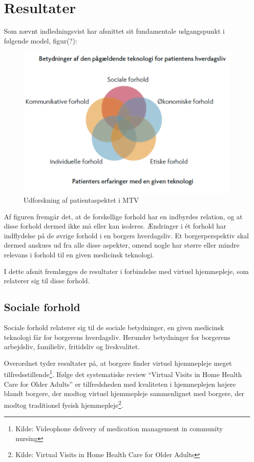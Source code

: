 \section{Resultater}
Som nævnt indledningsvist har afsnittet sit fundamentale udgangspunkt i følgende model, figur(?):

\begin{figure}[H]
	\centering
	\includegraphics[width=1\textwidth]{Figurer/Snip20160504_25}
	\caption{Udforskning af patientaspektet i MTV \protect\footnotemark}
\end{figure}

Af figuren fremgår det, at de forskellige forhold har en indbyrdes relation, og at disse forhold dermed ikke må eller kan isoleres. Ændringer i ét forhold har indflydelse på de øvrige forhold i en borgers hverdagsliv. Et borgerperspektiv skal dermed anskues ud fra alle disse aspekter, omend nogle har større eller mindre relevans i forhold til en given medicinsk teknologi.

I dette afsnit fremlægges de resultater i forbindelse med virtuel hjemmepleje, som relaterer sig til disse forhold. 

\subsection{Sociale forhold}
Sociale forhold relaterer sig til de sociale betydninger, en given medicinsk teknologi får for borgerens hverdagsliv. Herunder betydninger for borgerens arbejdsliv, familieliv, fritidsliv og livskvalitet. 

Overordnet tyder resultater på, at borgere finder virtuel hjemmepleje meget tilfredsstillende\footnote{Kilde: Videophone delivery of medication management in community nursing}. Ifølge det systematiske review “Virtual Visits in Home Health Care for Older Adults” er tilfredsheden med kvaliteten i hjemmeplejen højere blandt borgere, der modtog virtuel hjemmepleje sammenlignet med borgere, der modtog traditionel fysisk hjemmepleje\footnote{Kilde: Virtual Visits in Home Health Care for Older Adults}. 

